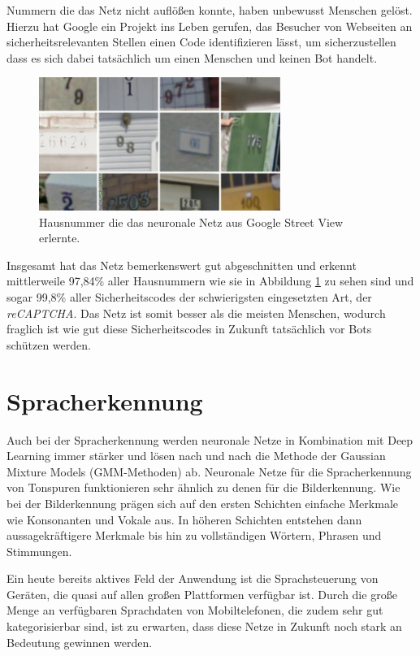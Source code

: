 Nummern die das Netz nicht auflößen konnte, haben unbewusst Menschen gelöst. Hierzu hat Google ein Projekt ins Leben gerufen, das Besucher von Webseiten an sicherheitsrelevanten Stellen einen Code identifizieren lässt, um sicherzustellen dass es sich dabei tatsächlich um einen Menschen und keinen Bot handelt.

\begin{figure}
	\centering
	\includegraphics[width=0.7\textwidth]{images/streetview-numbers.jpg}
	\caption{Hausnummer die das neuronale Netz aus Google Street View erlernte.}
	\label{fig:streetview-numbers}
\end{figure}

Insgesamt hat das Netz bemerkenswert gut abgeschnitten und erkennt mittlerweile 97,84\% aller Hausnummern wie sie in Abbildung \ref{fig:streetview-numbers} zu sehen sind und sogar 99,8\% aller Sicherheitscodes der schwierigsten eingesetzten Art, der \emph{reCAPTCHA}\todo{}. Das Netz ist somit besser als die meisten Menschen, wodurch fraglich ist wie gut diese Sicherheitscodes in Zukunft tatsächlich vor Bots schützen werden.

\section{Spracherkennung}

Auch bei der Spracherkennung werden neuronale Netze in Kombination mit Deep Learning immer stärker und lösen nach und nach die Methode der Gaussian Mixture Models (GMM-Methoden) ab. Neuronale Netze für die Spracherkennung von Tonspuren funktionieren sehr ähnlich zu denen für die Bilderkennung. Wie bei der Bilderkennung prägen sich auf den ersten Schichten einfache Merkmale wie Konsonanten und Vokale aus. In höheren Schichten entstehen dann aussagekräftigere Merkmale bis hin zu vollständigen Wörtern, Phrasen und Stimmungen. 

Ein heute bereits aktives Feld der Anwendung ist die Sprachsteuerung von Geräten, die quasi auf allen großen Plattformen verfügbar ist. Durch die große Menge an verfügbaren Sprachdaten von Mobiltelefonen, die zudem sehr gut kategorisierbar sind, ist zu erwarten, dass diese Netze in Zukunft noch stark an Bedeutung gewinnen werden.


